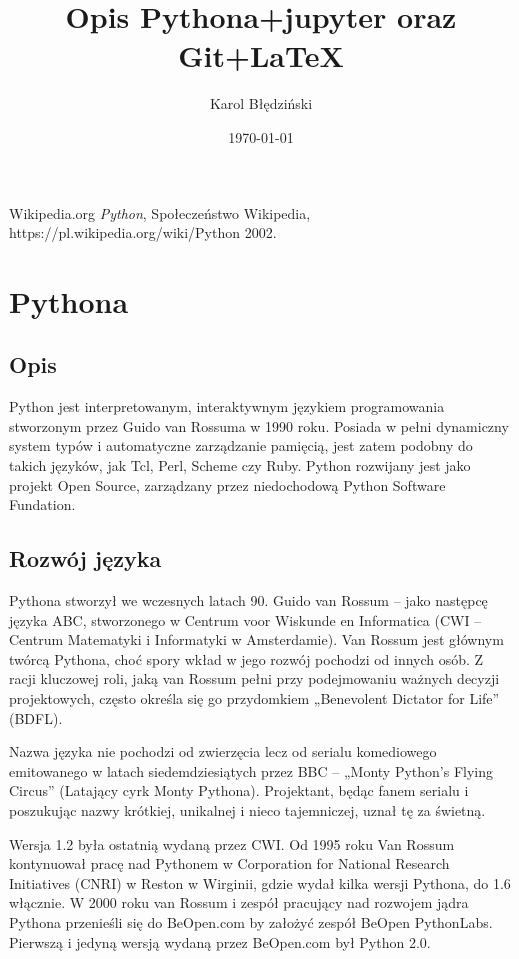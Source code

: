 \documentclass{article}
\title{Opis Pythona+jupyter oraz Git+LaTeX}
\date{\today}
\author{Karol Błędziński}
\begin{document}
  \maketitle
  \begin{thebibliography}{9}

  Wikipedia.org
  \textit{ Python},
  Społeczeństwo Wikipedia,
  https://pl.wikipedia.org/wiki/Python
  2002.

\end{thebibliography}
  \newpage

\section{Pythona}
\subsection{Opis}
	Python jest interpretowanym, interaktywnym językiem programowania stworzonym przez Guido van Rossuma w 1990 roku. Posiada w pełni dynamiczny system typów i automatyczne zarządzanie pamięcią, jest zatem podobny do takich języków, jak Tcl, Perl, Scheme czy Ruby. Python rozwijany jest jako projekt Open Source, zarządzany przez niedochodową Python Software Fundation.
\subsection{Rozwój języka}
	Pythona stworzył we wczesnych latach 90. Guido van Rossum – jako następcę języka ABC, stworzonego w Centrum voor Wiskunde en Informatica (CWI – Centrum Matematyki i Informatyki w Amsterdamie). Van Rossum jest głównym twórcą Pythona, choć spory wkład w jego rozwój pochodzi od innych osób. Z racji kluczowej roli, jaką van Rossum pełni przy podejmowaniu ważnych decyzji projektowych, często określa się go przydomkiem „Benevolent Dictator for Life” (BDFL).

Nazwa języka nie pochodzi od zwierzęcia lecz od serialu komediowego emitowanego w latach siedemdziesiątych przez BBC – „Monty Python’s Flying Circus” (Latający cyrk Monty Pythona). Projektant, będąc fanem serialu i poszukując nazwy krótkiej, unikalnej i nieco tajemniczej, uznał tę za świetną.

Wersja 1.2 była ostatnią wydaną przez CWI. Od 1995 roku Van Rossum kontynuował pracę nad Pythonem w Corporation for National Research Initiatives (CNRI) w Reston w Wirginii, gdzie wydał kilka wersji Pythona, do 1.6 włącznie. W 2000 roku van Rossum i zespół pracujący nad rozwojem jądra Pythona przenieśli się do BeOpen.com by założyć zespół BeOpen PythonLabs. Pierwszą i jedyną wersją wydaną przez BeOpen.com był Python 2.0.
\end{document}

